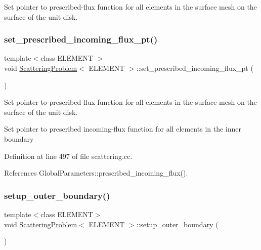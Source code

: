 Set pointer to prescribed-\/flux function for all elements in the surface mesh on the surface of the unit disk. 

\mbox{\label{classScatteringProblem_ae75307dde909513a0f11057c96cdd622}} 
\subsubsection{\texorpdfstring{set\+\_\+prescribed\+\_\+incoming\+\_\+flux\+\_\+pt()}{set\_prescribed\_incoming\_flux\_pt()}\hspace{0.1cm}{\footnotesize\ttfamily [2/2]}}
{\footnotesize\ttfamily template$<$class E\+L\+E\+M\+E\+NT $>$ \\
void \hyperlink{classScatteringProblem}{Scattering\+Problem}$<$ E\+L\+E\+M\+E\+NT $>$\+::set\+\_\+prescribed\+\_\+incoming\+\_\+flux\+\_\+pt (\begin{DoxyParamCaption}{ }\end{DoxyParamCaption})}



Set pointer to prescribed-\/flux function for all elements in the surface mesh on the surface of the unit disk. 

Set pointer to prescribed incoming-\/flux function for all elements in the inner boundary 

Definition at line 497 of file scattering.\+cc.



References Global\+Parameters\+::prescribed\+\_\+incoming\+\_\+flux().

\mbox{\label{classScatteringProblem_a76bd8299ea7ed559681b294acfb2aad4}} 
\subsubsection{\texorpdfstring{setup\+\_\+outer\+\_\+boundary()}{setup\_outer\_boundary()}\hspace{0.1cm}{\footnotesize\ttfamily [1/2]}}
{\footnotesize\ttfamily template$<$class E\+L\+E\+M\+E\+NT$>$ \\
void \hyperlink{classScatteringProblem}{Scattering\+Problem}$<$ E\+L\+E\+M\+E\+NT $>$\+::setup\+\_\+outer\+\_\+boundary (\begin{DoxyParamCaption}{ }\end{DoxyParamCaption})}



